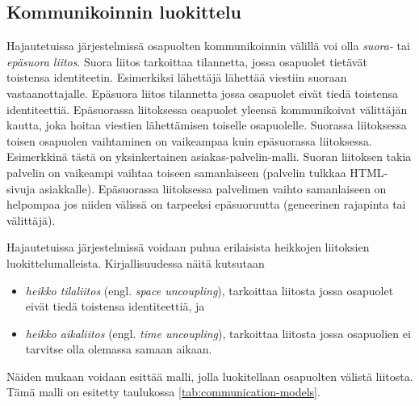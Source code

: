 \subsection{Kommunikoinnin luokittelu}
Hajautetuissa järjestelmissä osapuolten kommunikoinnin välillä voi olla \emph{suora-} tai \emph{epäsuora liitos}. Suora liitos tarkoittaa tilannetta, jossa osapuolet tietävät toistensa identiteetin. Esimerkiksi lähettäjä lähettää viestiin suoraan vastaanottajalle. Epäsuora liitos tilannetta jossa osapuolet eivät tiedä toistensa identiteettiä. Epäsuorassa liitoksessa osapuolet yleensä kommunikoivat välittäjän kautta, joka hoitaa viestien lähettämisen toiselle osapuolelle. Suorassa liitoksessa toisen osapuolen vaihtaminen on vaikeampaa kuin epäsuorassa liitoksessa. Esimerkkinä tästä on yksinkertainen asiakas-palvelin-malli. Suoran liitoksen takia palvelin on vaikeampi vaihtaa toiseen samanlaiseen (palvelin tulkkaa HTML-sivuja asiakkalle). Epäsuorassa liitoksessa palvelimen vaihto samanlaiseen on helpompaa jos niiden välissä on tarpeeksi epäsuoruutta (geneerinen rajapinta tai välittäjä). \cite[s.~230]{distributed-systems-concepts-and-design}

Hajautetuissa järjestelmissä voidaan puhua erilaisista heikkojen liitoksien luokittelumalleista. Kirjallisuudessa näitä kutsutaan
\begin{itemize}
	\item \emph{heikko tilaliitos} (engl. \emph{space uncoupling}), tarkoittaa liitosta jossa osapuolet eivät tiedä toistensa identiteettiä, ja
	\item \emph{heikko aikaliitos} (engl. \emph{time uncoupling}), tarkoittaa liitosta jossa osapuolien ei tarvitse olla olemassa samaan aikaan.
\end{itemize}
Näiden mukaan voidaan esittää malli, jolla luokitellaan osapuolten välistä liitosta. Tämä malli on esitetty taulukossa \ref{tab:communication-models}. \cite[s.~230]{distributed-systems-concepts-and-design} \cite[s.~116]{eugster2003many}

